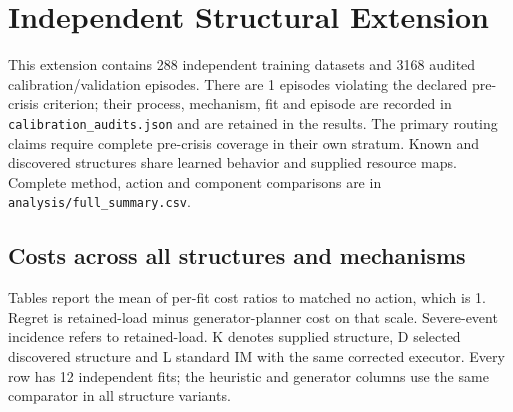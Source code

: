 \clearpage

\section{Independent Structural Extension}

This extension contains 288 independent training datasets and 3168 audited calibration/validation episodes. There are 1 episodes violating the declared pre-crisis criterion; their process, mechanism, fit and episode are recorded in \texttt{calibration\_audits.json} and are retained in the results. The primary routing claims require complete pre-crisis coverage in their own stratum. Known and discovered structures share learned behavior and supplied resource maps. Complete method, action and component comparisons are in \texttt{analysis/full\_summary.csv}.

\subsection{Costs across all structures and mechanisms}

Tables report the mean of per-fit cost ratios to matched no action, which is 1. Regret is retained-load minus generator-planner cost on that scale. Severe-event incidence refers to retained-load. K denotes supplied structure, D selected discovered structure and L standard IM with the same corrected executor. Every row has 12 independent fits; the heuristic and generator columns use the same comparator in all structure variants.

